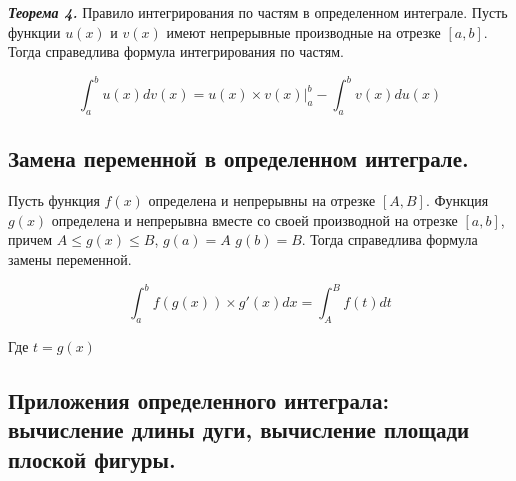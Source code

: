 \documentclass[a4paper,12pt]{article}
\theoremstyle{plain} %
\theoremstyle{definition} %
\theoremstyle{remark} %
\begin{document}
\textit{\textbf{Теорема 4.}} Правило интегрирования по частям в определенном интеграле.
Пусть функции $u(x)$ и $v(x)$ имеют непрерывные производные на отрезке $[a, b]$. Тогда справедлива формула интегрирования по частям.

\[
	\int_a^b u(x) dv(x) = u(x) \times v(x) \Big|_a^b - \int_a^b v(x) du(x)
\]


\newpage
\subsection*{Замена переменной в определенном интеграле.                                                  }
Пусть функция $f(x)$ определена и непрерывны на отрезке $[A, B]$. Функция $g(x)$ определена и непрерывна вместе со своей производной на отрезке $[a, b]$, причем $A \leq g(x) \leq B$, $g(a) = A$ $g(b) = B$. Тогда справедлива формула замены переменной.

\[
	\int_a^b f(g(x)) \times g'(x) dx = \int_A^B f(t) dt
\]

Где $t = g(x)$

\newpage
\subsection*{Приложения определенного интеграла: вычисление длины дуги, вычисление площади плоской фигуры.}
\end{document}

